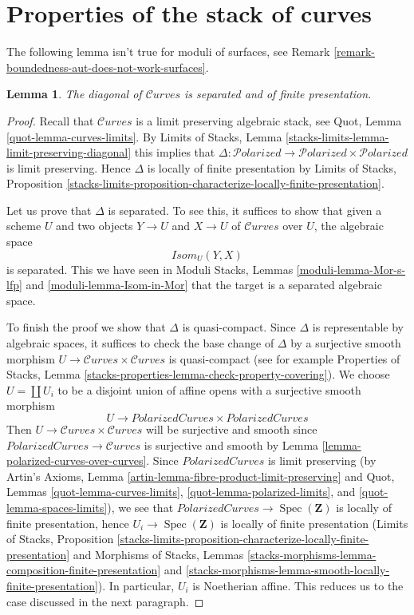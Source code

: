\documentclass{stacks-project}
\theoremstyle{plain}
\newtheorem{lemma}[subsection]{Lemma}
\theoremstyle{definition}
\theoremstyle{remark}
\numberwithin{equation}{subsection}
\def\Spec{\mathop{\mathrm{Spec}}}
\def\Curvesstack{\mathcal{C}\!\mathit{urves}}
\def\Polarizedstack{\mathcal{P}\!\mathit{olarized}}
\begin{document}
\section{Properties of the stack of curves}
\label{section-properties}

\noindent
The following lemma isn't true for moduli of surfaces, see
Remark \ref{remark-boundedness-aut-does-not-work-surfaces}.

\begin{lemma}
\label{lemma-curves-diagonal-separated-fp}
The diagonal of $\Curvesstack$ is separated
and of finite presentation.
\end{lemma}

\begin{proof}
Recall that $\Curvesstack$ is a limit preserving algebraic stack, see
Quot, Lemma \ref{quot-lemma-curves-limits}.
By Limits of Stacks, Lemma \ref{stacks-limits-lemma-limit-preserving-diagonal}
this implies that
$\Delta : \Polarizedstack \to \Polarizedstack \times \Polarizedstack$
is limit preserving. Hence $\Delta$ is locally of finite presentation
by Limits of Stacks, Proposition
\ref{stacks-limits-proposition-characterize-locally-finite-presentation}.

\medskip\noindent
Let us prove that $\Delta$ is separated. To see this, it suffices to show
that given a scheme $U$ and two objects $Y \to U$ and $X \to U$ of
$\Curvesstack$ over $U$, the algebraic space
$$
\mathit{Isom}_U(Y, X)
$$
is separated. This we have seen in
Moduli Stacks, Lemmas \ref{moduli-lemma-Mor-s-lfp} and
\ref{moduli-lemma-Isom-in-Mor} that the target is
a separated algebraic space.

\medskip\noindent
To finish the proof we show that $\Delta$ is quasi-compact. Since
$\Delta$ is representable by algebraic spaces, it suffices to check
the base change of $\Delta$ by a surjective smooth morphism
$U \to \Curvesstack \times \Curvesstack$ is quasi-compact
(see for example Properties of Stacks, Lemma
\ref{stacks-properties-lemma-check-property-covering}).
We choose $U = \coprod U_i$ to be a disjoint union of affine opens
with a surjective smooth morphism
$$
U \longrightarrow
\textit{PolarizedCurves} \times \textit{PolarizedCurves}
$$
Then $U \to \Curvesstack \times \Curvesstack$ will be surjective
and smooth since $\textit{PolarizedCurves} \to \Curvesstack$
is surjective and smooth by Lemma \ref{lemma-polarized-curves-over-curves}.
Since $\textit{PolarizedCurves}$ is limit preserving
(by Artin's Axioms, Lemma \ref{artin-lemma-fibre-product-limit-preserving}
and Quot, Lemmas \ref{quot-lemma-curves-limits},
\ref{quot-lemma-polarized-limits}, and
\ref{quot-lemma-spaces-limits}), we
see that $\textit{PolarizedCurves} \to \Spec(\mathbf{Z})$ is locally of
finite presentation, hence $U_i \to \Spec(\mathbf{Z})$ is
locally of finite presentation
(Limits of Stacks, Proposition
\ref{stacks-limits-proposition-characterize-locally-finite-presentation}
and Morphisms of Stacks, Lemmas
\ref{stacks-morphisms-lemma-composition-finite-presentation} and
\ref{stacks-morphisms-lemma-smooth-locally-finite-presentation}).
In particular, $U_i$ is Noetherian affine. This reduces us to the
case discussed in the next paragraph.


\end{proof}
\end{document}
